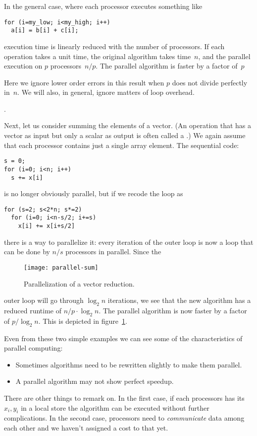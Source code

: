 In the general case, where each processor executes something like
\begin{verbatim}
for (i=my_low; i<my_high; i++)
  a[i] = b[i] + c[i];
\end{verbatim}
execution time is linearly
reduced with the number of processors. If each operation takes a unit
time, the original algorithm takes time~$n$, and the parallel
execution on $p$ processors~$n/p$. The parallel algorithm is faster by
a factor of~$p$%
\begin{footnoteenv}
  {Here we ignore lower order errors in this result
  when $p$ does not divide perfectly in~$n$. We will also, in general,
  ignore matters of loop overhead.}
\end{footnoteenv}
.

Next, let us consider summing the elements of a vector.
(An operation that has a vector as input but only a scalar as output
is often called a .)
We again
assume that each processor contains just a single array element. The
sequential code:
\begin{verbatim}
s = 0;
for (i=0; i<n; i++)
  s += x[i]
\end{verbatim}
is no longer obviously parallel, but if we recode the loop as
\begin{verbatim}
for (s=2; s<2*n; s*=2)
  for (i=0; i<n-s/2; i+=s)
    x[i] += x[i+s/2]
\end{verbatim}
there is a way to parallelize it: every iteration of the outer loop is
now a loop that can be done by $n/s$ processors in parallel. Since the
\begin{figure}[ht]
  \texttt{[image: parallel-sum]}
  \caption{Parallelization of a vector reduction.}
  \label{fig:par-sum}
\end{figure}
outer loop will go through $\log_2n$ iterations, we see that the new
algorithm has a reduced runtime of $n/p\cdot\log_2 n$. The parallel
algorithm is now faster by a factor of $p/\log_2n$. This is depicted
in figure~\ref{fig:par-sum}.

Even from these two simple examples we can see some of the
characteristics of parallel computing:
\begin{itemize}
\item Sometimes algorithms need to be rewritten slightly to make them
  parallel.
\item A parallel algorithm may not show perfect speedup.
\end{itemize}
There are other things to remark on. In the first case, if each
processors has its $x_i,y_i$ in a local store the
algorithm can be executed without further complications. In the second
case, processors need to \emph{communicate} data among each
other and we haven't assigned a cost to that yet.

